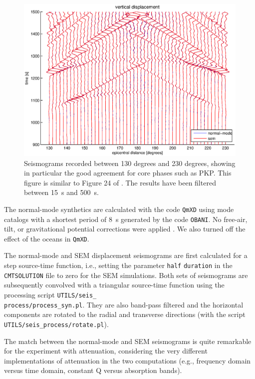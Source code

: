 \documentclass[oneside,english]{book}
\begin{document}
%
\begin{figure}[ht]
\noindent \begin{centering}
\includegraphics[scale=0.75]{figures/PKPdf_all_15s500s.eps}\caption{\label{fig:Bolivia-PKP}Seismograms recorded between 130 degrees and
230 degrees, showing in particular the good agreement for core phases
such as PKP. This figure is similar to Figure 24 of \citet{KoTr02a}.
The results have been filtered between 15~s and 500~s.}

\par\end{centering}
\end{figure}


The normal-mode synthetics are calculated with the code \texttt{QmXD}
using mode catalogs with a shortest period of 8~s generated by the
code \texttt{OBANI}. No free-air, tilt, or gravitational potential
corrections were applied \citep{DaTr98}. We also turned off the effect
of the oceans in \texttt{QmXD}.

The normal-mode and SEM displacement seismograms are first calculated
for a step source-time function, i.e., setting the parameter \texttt{half}
\texttt{duration} in the \texttt{CMTSOLUTION} file to zero for the
SEM simulations. Both sets of seismograms are subsequently convolved
with a triangular source-time function using the processing script
\texttt{UTILS/seis\_}~\\
\texttt{process/process\_syn.pl}. They are also band-pass filtered
and the horizontal components are rotated to the radial and transverse
directions (with the script \texttt{UTILS/seis\_process/rotate.pl}).

The match between the normal-mode and SEM seismograms is quite remarkable
for the experiment with attenuation, considering the very different
implementations of attenuation in the two computations (e.g., frequency
domain versus time domain, constant Q versus absorption bands).
\end{document}
